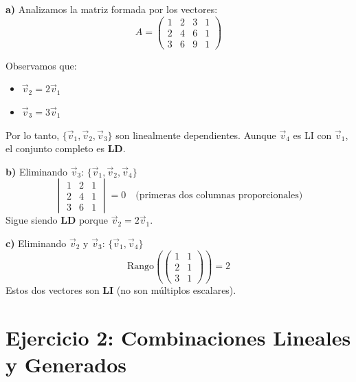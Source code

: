 \documentclass[11pt]{article}
\begin{document}
\begin{tcolorbox}[colback=green1!10, colframe=green1, title=Solución]
\textbf{a)} Analizamos la matriz formada por los vectores:
\[
A = \begin{pmatrix}
1 & 2 & 3 & 1 \\
2 & 4 & 6 & 1 \\
3 & 6 & 9 & 1
\end{pmatrix}
\]

Observamos que:
\begin{itemize}
    \item $\vec{v}_2 = 2\vec{v}_1$
    \item $\vec{v}_3 = 3\vec{v}_1$
\end{itemize}
Por lo tanto, $\{\vec{v}_1, \vec{v}_2, \vec{v}_3\}$ son linealmente dependientes. 
Aunque $\vec{v}_4$ es LI con $\vec{v}_1$, el conjunto completo es \textbf{LD}.

\textbf{b)} Eliminando $\vec{v}_3$: $\{\vec{v}_1, \vec{v}_2, \vec{v}_4\}$
\[
\begin{vmatrix}
1 & 2 & 1 \\
2 & 4 & 1 \\
3 & 6 & 1
\end{vmatrix} = 0 \quad \text{(primeras dos columnas proporcionales)}
\]
Sigue siendo \textbf{LD} porque $\vec{v}_2 = 2\vec{v}_1$.

\textbf{c)} Eliminando $\vec{v}_2$ y $\vec{v}_3$: $\{\vec{v}_1, \vec{v}_4\}$
\[
\text{Rango}\left(\begin{pmatrix}1 & 1\\ 2 & 1\\ 3 & 1\end{pmatrix}\right) = 2
\]
Estos dos vectores son \textbf{LI} (no son múltiplos escalares).
\end{tcolorbox}

\section*{Ejercicio 2: Combinaciones Lineales y Generados}
\end{document}
